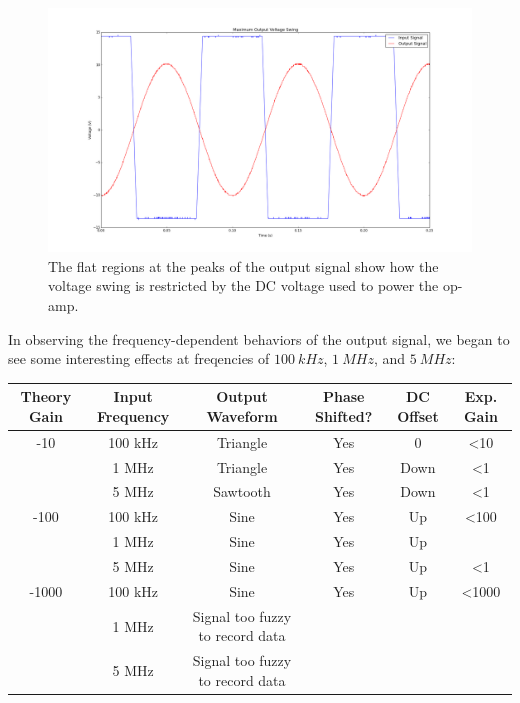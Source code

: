 \documentclass[11pt]{article}
\begin{document}
\begin{figure}[H]
    \centering
    \includegraphics[scale=0.3]{Plots/figB.png}
    \caption{The flat regions at the peaks of the output signal show how the voltage swing is restricted by the DC voltage used to power the op-amp.}
    \label{fig:b}
\end{figure}

In observing the frequency-dependent behaviors of the output signal, we began to see some interesting effects at freqencies of $100\ kHz$, $1\ MHz$, and $5\ MHz$:\\

\begin{center}
    \begin{tabular}[H]{ | c | c | c | c | c | c | }
        \hline
        Theory Gain & Input Frequency & Output Waveform & Phase Shifted? & DC Offset & Exp. Gain \\ \hline
        -10 & 100 kHz & Triangle & Yes & 0 & \textless 10 \\ \hline
        & 1 MHz & Triangle & Yes & Down & \textless 1 \\ \hline
        & 5 MHz & Sawtooth & Yes & Down & \textless 1 \\ \hline
        -100 & 100 kHz & Sine & Yes & Up & \textless 100 \\ \hline
        & 1 MHz & Sine & Yes & Up & \approx 1 \\ \hline
        & 5 MHz & Sine & Yes & Up & \textless 1 \\ \hline
        -1000 & 100 kHz & Sine & Yes & Up & \textless 1000 \\ \hline
        & 1 MHz & Signal too fuzzy to record data & & & \\ \hline
        & 5 MHz & Signal too fuzzy to record data & & & \\ \hline
    \end{tabular}
\end{center}
\end{document}
